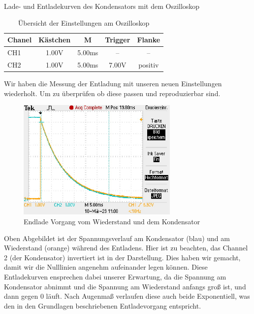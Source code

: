 \documentclass[twoside]{protokoll}
\begin{document}
\begin{aufgabe}{Lade- und Entladekurven des Kondensators mit dem Oszilloskop}
\begin{table}[H]
        \centering
        \begin{tabularx}{0.8\textwidth}{X c c c c} %
            \toprule
            \textbf{Chanel} & \textbf{Kästchen} & \textbf{M} & \textbf{Trigger} & \textbf{Flanke} \\
            \midrule
            CH1 & 1.00V & 5.00ms & -- & -- \\
            CH2 & 1.00V & 5.00ms & 7.00V & positiv \\
            \bottomrule
        \end{tabularx}
        \caption{Übersicht der Einstellungen am Oszilloskop}
        \label{tab:mytable}
    \end{table}

Wir haben die Messung der Entladung mit unseren neuen Einstellungen wiederholt. Um zu überprüfen ob diese passen und reproduzierbar sind.

 


\begin{figure}[H]
  \centering
    \includegraphics[width=0.7\textwidth]{Bilder_Osziloskop/Entladen_Kondensator_02.pdf}
    \caption{Endlade Vorgang vom Wiederstand und dem Kondensator}
  \centering
\end{figure}
Oben Abgebildet ist der Spannungsverlauf am Kondensator (blau) und am Wiederstand (orange) während des Entladens.
Hier ist zu beachten, das Channel 2 (der Kondensator) invertiert ist in der Darstellung.
Dies haben wir gemacht, damit wir die Nulllinien angenehm aufeinander legen können.
Diese Entladekurven ensprechen dabei unserer Erwartung, da die Spannung am Kondensator abnimmt und die Spannung am Wiederstand anfangs groß ist, und dann gegen 0 läuft.
Nach Augenmaß verlaufen diese auch beide Exponentiell, was den in den Grundlagen beschriebenen Entladevorgang entspricht.


\end{aufgabe}
\end{document}
